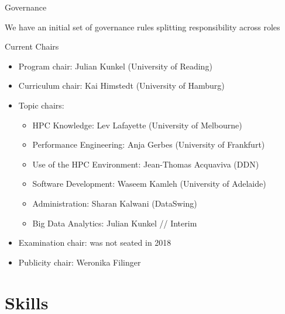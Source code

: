 \documentclass[compress,aspectratio=169]{beamer}
\begin{document}
\begin{frame}{Governance}

	\smallskip
  We have an initial set of governance rules splitting responsibility across roles

  \begin{block}{Current Chairs}
  \vspace*{-0.5em}
  \begin{itemize}
    \item Program chair: Julian Kunkel (University of Reading)
    \item Curriculum chair: Kai Himstedt (University of Hamburg)
    \item  Topic chairs:
    \begin{itemize}
      \item HPC Knowledge: Lev Lafayette (University of Melbourne)
      \item Performance Engineering: Anja Gerbes (University of Frankfurt)
      \item Use of the HPC Environment: Jean-Thomas Acquaviva (DDN)
      \item Software Development: Waseem Kamleh (University of Adelaide)
			\item Administration: Sharan Kalwani (DataSwing)
			\item Big Data Analytics: Julian Kunkel // Interim
    \end{itemize}
    \item Examination chair: was not seated in 2018
    \item Publicity chair: Weronika Filinger
  \end{itemize}
  \end{block}
\end{frame}

\section{Skills}
\sectionIntroHidden
\end{document}
